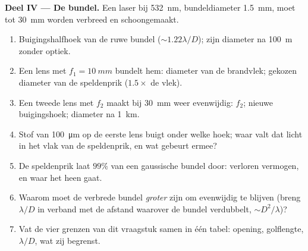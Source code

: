 \begin{problem}
\medskip
\noindent\textbf{Deel IV --- De bundel.}
Een laser bij \qty{532}{nm}, bundeldiameter \qty{1.5}{mm}, moet tot
\qty{30}{mm} worden verbreed en schoongemaakt.
\begin{enumerate}[resume]
  \item Buigingshalfhoek van de ruwe bundel ($\sim1.22\lambda/D$); zijn
        diameter na \qty{100}{m} zonder optiek.
  \item Een lens met $f_1 = \qty{10}{mm}$ bundelt hem: diameter van de brandvlek;
        gekozen diameter van de speldenprik ($1.5\times$ de vlek).
  \item Een tweede lens met $f_2$ maakt bij \qty{30}{mm} weer evenwijdig:
        $f_2$; nieuwe
        buigingshoek; diameter na \qty{1}{km}.
  \item Stof van \qty{100}{\micro m} op de eerste lens buigt onder welke hoek;
        waar valt dat licht in het vlak van de speldenprik, en wat
        gebeurt ermee?
  \item De speldenprik laat $99\%$ van een gaussische bundel door: verloren
        vermogen, en
        waar het heen gaat.
  \item Waarom moet de verbrede bundel \emph{groter} zijn om evenwijdig te blijven
        (breng $\lambda/D$ in verband met de afstand waarover de bundel verdubbelt,
        $\sim D^2/\lambda$)?
  \item Vat de vier grenzen van dit vraagstuk samen in één tabel: opening,
        golflengte, $\lambda/D$, wat zij begrenst.
\end{enumerate}
\end{problem}
